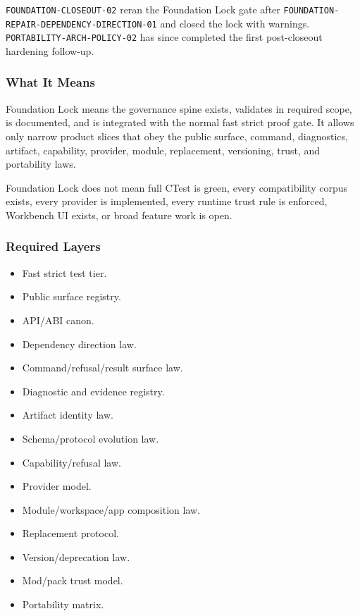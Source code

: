 \documentclass[9pt,a4paper,openany]{book}
\begin{document}
\texttt{FOUNDATION-\allowbreak{}CLOSEOUT-\allowbreak{}02} reran the Foundation Lock gate after \texttt{FOUNDATION-\allowbreak{}REPAIR-\allowbreak{}DEPENDENCY-\allowbreak{}DIRECTION-\allowbreak{}01} and closed the lock with warnings.\allowbreak{} \texttt{PORTABILITY-\allowbreak{}ARCH-\allowbreak{}POLICY-\allowbreak{}02} has since completed the first post-\allowbreak{}closeout hardening follow-\allowbreak{}up.\allowbreak{}


\subsubsection{What It Means}

Foundation Lock means the governance spine exists, validates in required scope, is documented, and is integrated with the normal fast strict proof gate.\allowbreak{} It allows only narrow product slices that obey the public surface, command, diagnostics, artifact, capability, provider, module, replacement, versioning, trust, and portability laws.\allowbreak{}


Foundation Lock does not mean full CTest is green, every compatibility corpus exists, every provider is implemented, every runtime trust rule is enforced, Workbench UI exists, or broad feature work is open.\allowbreak{}


\subsubsection{Required Layers}

\begin{itemize}
\item Fast strict test tier.\allowbreak{}
\item Public surface registry.\allowbreak{}
\item API/\allowbreak{}ABI canon.\allowbreak{}
\item Dependency direction law.\allowbreak{}
\item Command/\allowbreak{}refusal/\allowbreak{}result surface law.\allowbreak{}
\item Diagnostic and evidence registry.\allowbreak{}
\item Artifact identity law.\allowbreak{}
\item Schema/\allowbreak{}protocol evolution law.\allowbreak{}
\item Capability/\allowbreak{}refusal law.\allowbreak{}
\item Provider model.\allowbreak{}
\item Module/\allowbreak{}workspace/\allowbreak{}app composition law.\allowbreak{}
\item Replacement protocol.\allowbreak{}
\item Version/\allowbreak{}deprecation law.\allowbreak{}
\item Mod/\allowbreak{}pack trust model.\allowbreak{}
\item Portability matrix.\allowbreak{}
\end{itemize}
\end{document}
